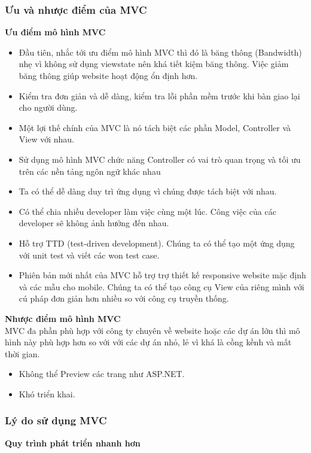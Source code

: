 \subsubsection{Ưu và nhược điểm của MVC}
\textbf{Ưu điểm mô hình MVC}
\begin{itemize}
    \item Đầu tiên, nhắc tới ưu điểm mô hình MVC thì đó là băng thông (Bandwidth) nhẹ vì không sử dụng viewstate nên khá tiết kiệm băng thông. Việc giảm băng thông giúp website hoạt động ổn định hơn.
    \item Kiểm tra đơn giản và dễ dàng, kiểm tra lỗi phần mềm trước khi bàn giao lại cho người dùng.
    \item Một lợi thế chính của MVC là nó tách biệt các phần Model, Controller và View với nhau.
    \item Sử dụng mô hình MVC chức năng Controller có vai trò quan trọng và tối ưu trên các nền tảng ngôn ngữ khác nhau
    \item Ta có thể dễ dàng duy trì ứng dụng vì chúng được tách biệt với nhau.
    \item Có thể chia nhiều developer làm việc cùng một lúc. Công việc của các developer sẽ không ảnh hưởng đến nhau.
    \item Hỗ trợ TTD (test-driven development). Chúng ta có thể tạo một ứng dụng với unit test và viết các won test case.
    \item Phiên bản mới nhất của MVC hỗ trợ trợ thiết kế responsive website mặc định và các mẫu cho mobile. Chúng ta có thể tạo công cụ View của riêng mình với cú pháp đơn giản hơn nhiều so với công cụ truyền thống.
\end{itemize}
\textbf{Nhược điểm mô hình MVC}\\

MVC đa phần phù hợp với công ty chuyên về website hoặc các dự án lớn thì mô hình này phù hợp hơn so với với các dự án nhỏ, lẻ vì khá là cồng kềnh và mất thời gian.

\begin{itemize}
    \item Không thể Preview các trang như ASP.NET.
    \item Khó triển khai.
\end{itemize}
\subsubsection{Lý do sử dụng MVC}
\textbf{Quy trình phát triển nhanh hơn}\\


